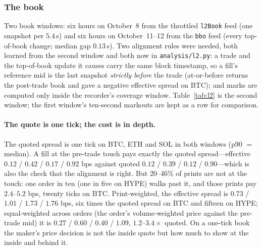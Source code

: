 \documentclass[11pt]{article}
\begin{document}
\subsubsection{The book}\label{sec:l2}
Two book windows: six hours on October~8 from the throttled \texttt{l2Book} feed (one snapshot per $5.4$\,s) and six hours on October~11--12 from the \texttt{bbo} feed (every top-of-book change; median gap $0.13$\,s). Two alignment rules were needed, both learned from the second window and both now in \texttt{analysis/l2.py}: a trade and the top-of-book update it causes carry the same block timestamp, so a fill's reference mid is the last snapshot \emph{strictly before} the trade (at-or-before returns the post-trade book and gave a negative effective spread on BTC); and marks are computed only inside the recorder's coverage window. Table~\ref{tab:l2} is the second window; the first window's ten-second markouts are kept as a row for comparison.

\paragraph{The quote is one tick; the cost is in depth.} The quoted spread is one tick on BTC, ETH and SOL in both windows (p90 $=$ median). A fill at the pre-trade touch pays exactly the quoted spread---effective $0.12$ / $0.42$ / $0.17$ / $0.92$ bps against quoted $0.12$ / $0.39$ / $0.12$ / $0.90$---which is also the check that the alignment is right. But 20--46\% of prints are not at the touch: one order in ten (one in five on HYPE) walks past it, and those prints pay $2.4$--$5.2$ bps, twenty ticks on BTC. Print-weighted, the effective spread is $0.73$ / $1.01$ / $1.73$ / $1.76$ bps, six times the quoted spread on BTC and fifteen on HYPE; equal-weighted across orders (the order's volume-weighted price against the pre-trade mid) it is $0.27$ / $0.60$ / $0.40$ / $1.09$, $1.2$--$3.4\times$ quoted. On a one-tick book the maker's price decision is not the inside quote but how much to show at the inside and behind it.
\end{document}
